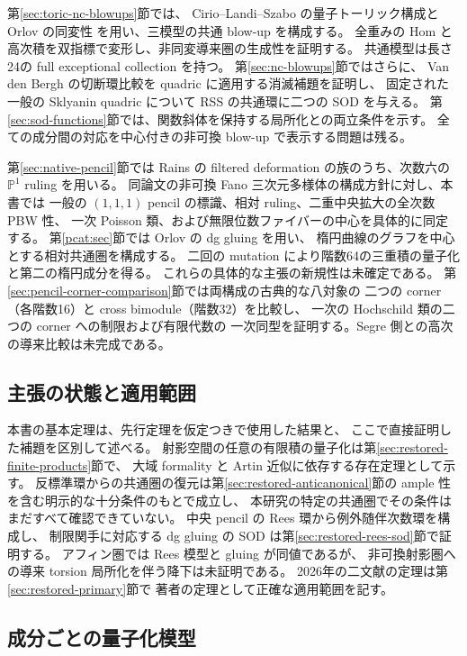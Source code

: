 \documentclass[11pt,a4paper]{ltjsarticle}
\theoremstyle{definition}
\begin{document}
第\ref{sec:toric-nc-blowups}節では、
Cirio--Landi--Szabo \cite{ToricCLS} の量子トーリック構成と
Orlov の同変性 \cite{ToricElagin} を用い、三模型の共通 blow-up を構成する。
全重みの Hom と高次積を双指標で変形し、非同変導来圏の生成性を証明する。
共通模型は長さ24の full exceptional collection を持つ。
第\ref{sec:nc-blowups}節ではさらに、
Van den Bergh の切断環比較を quadric に適用する消滅補題を証明し、
固定された一般の Sklyanin quadric について RSS の共通環に二つの SOD を与える。
第\ref{sec:sod-functions}節では、関数斜体を保持する局所化との両立条件を示す。
全ての成分間の対応を中心付きの非可換 blow-up で表示する問題は残る。


第\ref{sec:native-pencil}節では Rains \cite{PencilRainsFiltered} の
filtered deformation の族のうち、次数六の $\mathbb P^1$ ruling を用いる。
同論文の非可換 Fano 三次元多様体の構成方針に対し、本書では
一般の $(1,1,1)$ pencil の標識、相対 ruling、二重中央拡大の全次数 PBW 性、
一次 Poisson 類、および無限位数ファイバーの中心を具体的に同定する。
第\ref{pcat:sec}節では Orlov \cite{PencilOrlovGluing} の dg gluing を用い、
楕円曲線のグラフを中心とする相対共通圏を構成する。
二回の mutation により階数64の三重積の量子化と第二の楕円成分を得る。
これらの具体的な主張の新規性は未確定である。
第\ref{sec:pencil-corner-comparison}節では両構成の古典的な八対象の
二つの corner（各階数16）と cross bimodule（階数32）を比較し、
一次の Hochschild 類の二つの corner への制限および有限代数の
一次同型を証明する。Segre 側との高次の導来比較は未完成である。

\subsection{主張の状態と適用範囲}
本書の基本定理は、先行定理を仮定つきで使用した結果と、
ここで直接証明した補題を区別して述べる。
射影空間の任意の有限積の量子化は第\ref{sec:restored-finite-products}節で、
大域 formality と Artin 近似に依存する存在定理として示す。
反標準環からの共通圏の復元は第\ref{sec:restored-anticanonical}節の
ample 性を含む明示的な十分条件のもとで成立し、
本研究の特定の共通圏でその条件はまだすべて確認できていない。
中央 pencil の Rees 環から例外随伴次数環を構成し、
制限関手に対応する dg gluing の SOD は第\ref{sec:restored-rees-sod}節で証明する。
アフィン圏では Rees 模型と gluing が同値であるが、
非可換射影圏への導来 torsion 局所化を伴う降下は未証明である。
2026年の二文献の定理は第\ref{sec:restored-primary}節で
著者の定理として正確な適用範囲を記す。

\subsection{成分ごとの量子化模型}
\end{document}
